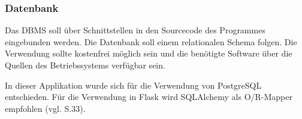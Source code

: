 \subsubsection{Datenbank}

Das \gls{DBMS} soll über Schnittstellen in den Sourcecode des Programmes eingebunden werden. Die Datenbank soll einem relationalen Schema folgen. Die Verwendung sollte kostenfrei möglich sein und die benötigte Software über die Quellen des Betriebssystems verfügbar sein.

In dieser Applikation wurde sich für die Verwendung von PostgreSQL entschieden. Für die Verwendung in Flask wird SQLAlchemy als O/R-Mapper  empfohlen (vgl. \cite{openingtheflask} S.33).



